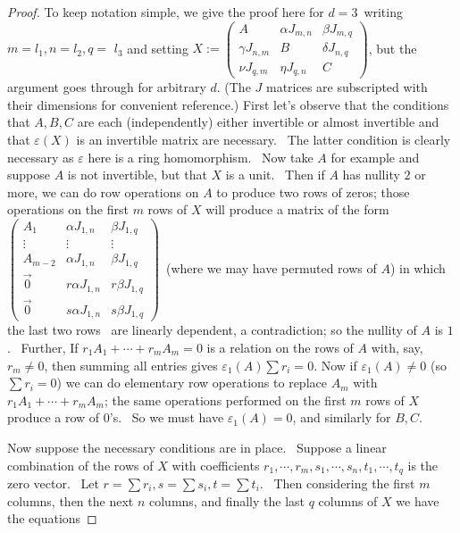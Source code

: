 \documentclass[12pt, a4paper]{amsart}
\numberwithin{equation}{section} %
\theoremstyle{plain}
\theoremstyle{definition}
\theoremstyle{plain}
\theoremstyle{remark}
\newcommand{\ones}{J}
\begin{document}
\begin{proof}  To keep notation simple, we give the proof here for $d=3$\, writing $m=l_{1},n=l_{2},q=$ $l_{3}$ and setting $X:=\left( 
\begin{array}{lll}
A & \alpha \ones_{m,n} & \beta \ones_{m,q} \\ 
\gamma \ones_{n,m} & B & \delta \ones_{n,q} \\ 
\nu \ones_{q,m} & \eta \ones_{q,n} & C%
\end{array}%
\right) $,  but
the argument goes through for arbitrary $d$. (The $\ones$  matrices are subscripted with their dimensions for convenient reference.) First let's observe that the conditions that $A,B,C$ are each
(independently) either invertible or almost invertible and that $\varepsilon(X)$ is
an invertible matrix are necessary. \ The latter condition is clearly
necessary as $\varepsilon$ here is a ring homomorphism. \ Now take $A$ for example
and suppose $A$ is not invertible, but that $X$ is a unit. \ Then if $A$ has
nullity $2$ or more, we can do row operations on $A$ to produce two rows of
zeros; those operations on the first $m$ rows of $X$ will produce a matrix
of the form $\left( 
\begin{array}{lll}
A_{1} & \alpha \ones_{1,n} & \beta \ones_{1,q} \\ 
\vdots & \vdots & \vdots \\ 
A_{m-2} & \alpha \ones_{1,n} & \beta \ones_{1,q} \\ 
\overrightarrow{0} & r\alpha \ones_{1,n} & r\beta \ones_{1,q} \\ 
\overrightarrow{0} & s\alpha \ones_{1,n} & s\beta \ones_{1,q}%
\end{array}%
\right) $\ (where we may have permuted rows of $A$) in which the last two
rows \ are linearly dependent, a contradiction; so the nullity of $A$ is $1$%
. \ Further, If $r_{1}A_{1}+\cdots +r_{m}A_{m}=0$ is a relation on the rows
of $A$ with, say, $r_{m}\neq 0$, then summing all entries gives $\varepsilon_1(A)\sum
r_{i}=0.$ Now if $\varepsilon_1(A)\neq 0$ (so $\sum r_{i}=0$) we can do elementary row
operations to replace $A_{m}$ with $r_{1}A_{1}+\cdots +r_{m}A_{m}$; the same
operations performed on the first $m$ rows of $X$ produce a row of $0$'s. \
So we must have $\varepsilon_1(A)=0$, and similarly for $B,C$.

\bigskip

Now suppose the necessary conditions are in place.   \ Suppose a linear
combination of the rows of $X$ with coefficients $r_{1},\cdots
,r_{m},s_{1},\cdots ,s_{n},t_{1},\cdots ,t_{q}$ is the zero vector. \ Let $%
r=\sum r_{i},s=\sum s_{i},t=\sum t_{i}$. \ Then considering the first $m$
columns, then the next $n$ columns, and finally the last $q$ columns of $X$
we have the equations


\end{proof}
\end{document}
